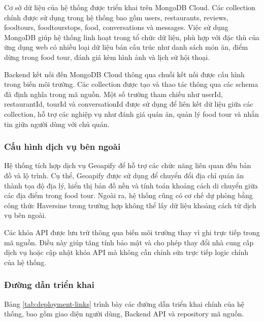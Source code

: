 Cơ sở dữ liệu của hệ thống được triển khai trên MongoDB Cloud. Các collection chính
được sử dụng trong hệ thống bao gồm users, restaurants, reviews, foodtours,
foodtourstops, food, conversations và messages. Việc sử dụng MongoDB giúp hệ thống
linh hoạt trong tổ chức dữ liệu, phù hợp với đặc thù của ứng dụng web có nhiều loại dữ
liệu bán cấu trúc như danh sách món ăn, điểm dừng trong food tour, đánh giá kèm hình
ảnh và lịch sử hội thoại.

Backend kết nối đến MongoDB Cloud thông qua chuỗi kết nối được cấu hình trong biến
môi trường. Các collection được tạo và thao tác thông qua các schema đã định nghĩa trong
mã nguồn. Một số trường tham chiếu như userId, restaurantId, tourId và conversationId
được sử dụng để liên kết dữ liệu giữa các collection, hỗ trợ các nghiệp vụ như đánh giá
quán ăn, quản lý food tour và nhắn tin giữa người dùng với chủ quán.

\subsubsection{Cấu hình dịch vụ bên ngoài}

Hệ thống tích hợp dịch vụ Geoapify để hỗ trợ các chức năng liên quan đến bản đồ và lộ
trình. Cụ thể, Geoapify được sử dụng để chuyển đổi địa chỉ quán ăn thành tọa độ địa lý,
hiển thị bản đồ nền và tính toán khoảng cách di chuyển giữa các địa điểm trong food tour.
Ngoài ra, hệ thống cũng có cơ chế dự phòng bằng công thức Haversine trong trường hợp
không thể lấy dữ liệu khoảng cách từ dịch vụ bên ngoài.

Các khóa API được lưu trữ thông qua biến môi trường thay vì ghi trực tiếp trong mã
nguồn. Điều này giúp tăng tính bảo mật và cho phép thay đổi nhà cung cấp dịch vụ hoặc
cập nhật khóa API mà không cần chỉnh sửa trực tiếp logic chính của hệ thống.

\subsubsection{Đường dẫn triển khai}

Bảng \ref{tab:deployment-links} trình bày các đường dẫn triển khai chính của hệ thống,
bao gồm giao diện người dùng, Backend API và repository mã nguồn.

